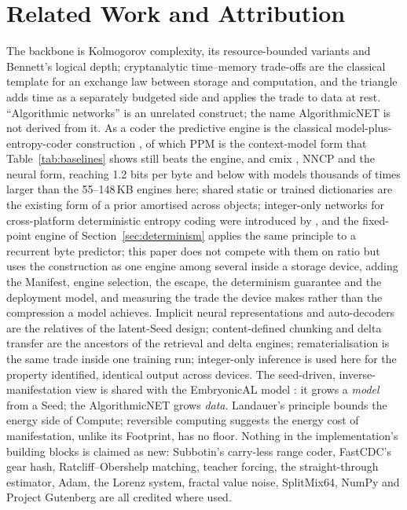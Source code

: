 \documentclass[11pt,a4paper]{article}
\theoremstyle{definition}
\theoremstyle{plain}
\theoremstyle{remark}
\newcommand{\anet}{AlgorithmicNET}
\begin{document}
\section{Related Work and Attribution}
\label{sec:related}
The backbone is Kolmogorov complexity, its resource-bounded variants and Bennett's logical depth;
cryptanalytic time--memory trade-offs \citep{hellman1980} are the classical template for an
exchange law between storage and computation, and the triangle adds time as a separately budgeted
side and applies the trade to data at rest. ``Algorithmic networks'' \citep{abrahao2017} is an
unrelated construct; the name \anet{} is not derived from it. As a coder the predictive engine is
the classical model-plus-entropy-coder construction \citep{witten1987,martin1979}, of which PPM
\citep{cleary1984,shkarin2002} is the context-model form that Table~\ref{tab:baselines} shows
still beats the engine, and cmix \citep{knoll2014cmix}, NNCP \citep{bellard2019nncp} and
\citet{deletang2023} the neural form, reaching 1.2 bits per byte and below with models thousands
of times larger than the 55--148\,KB engines here; shared static or trained dictionaries
\citep{alakuijala2016brotli,collet2021zstd} are the existing form of a prior amortised across
objects; integer-only networks for cross-platform deterministic entropy coding were introduced
by \citet{balle2019integer}, and the fixed-point engine of Section~\ref{sec:determinism} applies
the same principle to a recurrent byte predictor; this paper does not compete with them on ratio but uses the construction as one
engine among several inside a storage device, adding the Manifest, engine selection, the escape,
the determinism guarantee and the deployment model, and measuring the trade the device makes
rather than the compression a model achieves. Implicit neural representations
\citep{dupont2021coin,sitzmann2020siren,mildenhall2020nerf} and auto-decoders
\citep{park2019deepsdf} are the relatives of the latent-Seed design; content-defined chunking
\citep{muthitacharoen2001,xia2016fastcdc} and delta transfer \citep{tridgell1996} are the ancestors
of the retrieval and delta engines; rematerialisation \citep{chen2016checkpoint} is the same trade
inside one training run; integer-only inference \citep{jacob2018} is used here for the property \citet{balle2019integer}
identified, identical output across devices. The seed-driven, inverse-manifestation view is shared
with the EmbryonicAL model \citep{patil2026embryonical}: it grows a \emph{model} from a Seed; the
\anet{} grows \emph{data}. Landauer's principle \citep{landauer1961} bounds the energy side of
Compute; reversible computing \citep{bennett1973} suggests the energy cost of manifestation, unlike
its Footprint, has no floor. Nothing in the implementation's building blocks is claimed as new:
Subbotin's carry-less range coder, FastCDC's gear hash, Ratcliff--Obershelp matching, teacher
forcing, the straight-through estimator, Adam, the Lorenz system, fractal value noise, SplitMix64,
NumPy \citep{harris2020numpy} and Project Gutenberg \citep{gutenberg} are all credited where used.
\end{document}
